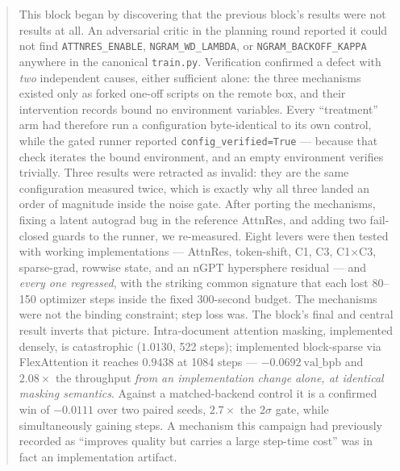 \documentclass{article}
\newcommand{\valbpb}{\mathrm{val\_bpb}}
\begin{document}
\printAffiliationsAndNotice{}

\begin{abstract}
This block began by discovering that the previous block's results were not results at all. An adversarial critic in the planning round reported it could not find \texttt{ATTNRES\_ENABLE}, \texttt{NGRAM\_WD\_LAMBDA}, or \texttt{NGRAM\_BACKOFF\_KAPPA} anywhere in the canonical \texttt{train.py}. Verification confirmed a defect with \emph{two} independent causes, either sufficient alone: the three mechanisms existed only as forked one-off scripts on the remote box, and their intervention records bound no environment variables. Every ``treatment'' arm had therefore run a configuration byte-identical to its own control, while the gated runner reported \texttt{config\_verified=True} --- because that check iterates the bound environment, and an empty environment verifies trivially. Three results were retracted as invalid: they are the same configuration measured twice, which is exactly why all three landed an order of magnitude inside the noise gate. After porting the mechanisms, fixing a latent autograd bug in the reference AttnRes, and adding two fail-closed guards to the runner, we re-measured. Eight levers were then tested with working implementations --- AttnRes, token-shift, C1, C3, C1$\times$C3, sparse-grad, rowwise state, and an nGPT hypersphere residual --- and \emph{every one regressed}, with the striking common signature that each lost 80--150 optimizer steps inside the fixed 300-second budget. The mechanisms were not the binding constraint; step loss was. The block's final and central result inverts that picture. Intra-document attention masking, implemented densely, is catastrophic ($1.0130$, 522 steps); implemented block-sparse via FlexAttention it reaches $0.9438$ at 1084 steps --- $-0.0692\ \valbpb$ and $2.08\times$ the throughput \emph{from an implementation change alone, at identical masking semantics}. Against a matched-backend control it is a confirmed win of $-0.0111$ over two paired seeds, $2.7\times$ the $2\sigma$ gate, while simultaneously gaining steps. A mechanism this campaign had previously recorded as ``improves quality but carries a large step-time cost'' was in fact an implementation artifact.
\end{abstract}
\end{document}
